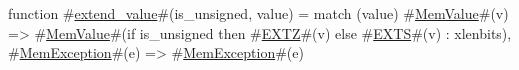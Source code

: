 function #\hyperref[sailRISCVzextendzyvalue]{extend\_value}#(is_unsigned, value) = match (value) {
  #\hyperref[sailRISCVzMemValue]{MemValue}#(v)     => #\hyperref[sailRISCVzMemValue]{MemValue}#(if is_unsigned then #\hyperref[sailRISCVzEXTZ]{EXTZ}#(v) else #\hyperref[sailRISCVzEXTS]{EXTS}#(v) : xlenbits),
  #\hyperref[sailRISCVzMemException]{MemException}#(e) => #\hyperref[sailRISCVzMemException]{MemException}#(e)
}
